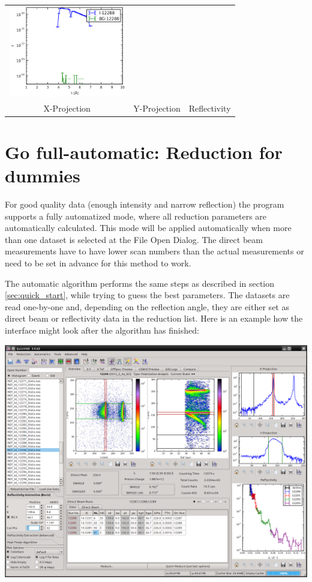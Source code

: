 \begin{tabular}{ccc}
  \includegraphics[width=145pt]{screenshots/normalize3.png} \\
  X-Projection & Y-Projection & Reflectivity
  \end{tabular}



\section{Go full-automatic: Reduction for dummies}
  For good quality data (enough intensity and narrow reflection) the program supports a fully automatized mode, where all reduction parameters are automatically calculated.
  This mode will be applied automatically when more than one dataset is selected at the File Open Dialog.
  The direct beam measurements have to have lower scan numbers than the actual measurements or need to be set in advance for this method to work.
  
  The automatic algorithm performs the same steps as described in section \ref{sec:quick_start}, while trying to guess the best parameters.
  The datasets are read one-by-one and, depending on the reflection angle, they are either set as direct beam or reflectivity data in the reduction list.
  Here is an example how the interface might look after the algorithm has finished:
  
  \includegraphics[width=460pt]{screenshots/overview.png}
  
